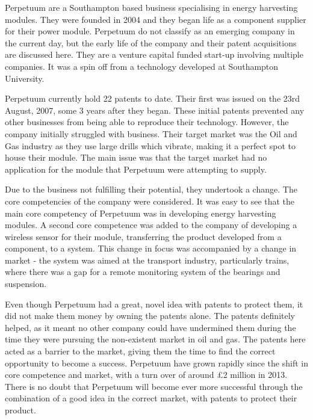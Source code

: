 {}


Perpetuum are a Southampton based business specialising in energy harvesting modules. 
They were founded in 2004 and they began life as a component supplier for their power module.
Perpetuum do not classify as an emerging company in the current day, but the early life of the company and their patent acquisitions are discussed here. 
They are a venture capital funded start-up involving multiple companies.
It was a spin off from a technology developed at Southampton University. 

Perpetuum currently hold 22 patents to date. 
Their first was issued on the 23rd August, 2007, some 3 years after they began.
These initial patents prevented any other businesses from being able to reproduce their technology. 
However, the company initially struggled with business.
Their target market was the Oil and Gas industry as they use large drills which vibrate, making it a perfect spot to house their module.
The main issue was that the target market had no application for the module that Perpetuum were attempting to supply. 

Due to the business not fulfilling their potential, they undertook a change. 
The core competencies of the company were considered.
It was easy to see that the main core competency of Perpetuum was in developing energy harvesting modules. 
A second core competence was added to the company of developing a wireless sensor for their module, transferring the product developed from a component, to a system.
This change in focus was accompanied by a change in market - the system was aimed at the transport industry, particularly trains, where there was a gap for a remote monitoring system of the bearings and suspension. 

Even though Perpetuum had a great, novel idea with patents to protect them, it did not make them money by owning the patents alone.
The patents definitely helped, as it meant no other company could have undermined them during the time they were pursuing the non-existent market in oil and gas.
The patents here acted as a barrier to the market, giving them the time to find the correct opportunity to become a success.
Perpetuum have grown rapidly since the shift in core competence and market, with a turn over of around \pounds 2 million in 2013.
There is no doubt that Perpetuum will become ever more successful through the combination of a good idea in the correct market, with patents to protect their product. 

